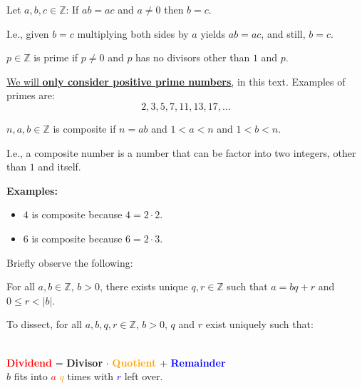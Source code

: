 \begin{Def}

    \label{def:cancellation_law}

    Let $a,b,c\in\mathbb{Z}$: If $ab=ac$ and $a\neq 0$ then $b=c$.

\end{Def}

\noindent
I.e., given $b=c$ multiplying both sides by $a$ yields $ab=ac$, and still, $b=c$.

\newpage

\begin{Def}

    \label{def:prime_numbers}

    $p\in\mathbb{Z}$ is prime if $p\neq 0$ and $p$ has no divisors other than $1$ and $p$.
\end{Def}
\underline{We will \textbf{only consider positive prime numbers},} in this text. Examples of primes are:
$$2,3,5,7,11,13,17,\dots$$

\begin{Def}

    \label{def:composite_numbers}

    $n,a,b\in\mathbb{Z}$ is composite if $n=ab$ and $1<a<n$ and $1<b<n$.
\end{Def}
I.e., a composite number is a number that can be factor into two integers, other than $1$ and itself.

\noindent
\textbf{Examples:}
\begin{itemize}
    \item $4$ is composite because $4=2\cdot2$.
    \item $6$ is composite because $6=2\cdot3$.
\end{itemize}

\noindent
Briefly observe the following:
\begin{theo}

    \label{theo:division_algorithm}

    For all $a,b\in\mathbb{Z}$, $b>0$, there exists unique $q,r\in\mathbb{Z}$ such that $a=bq+r$ and $0\leq r<|b|$.
\end{theo}

\noindent
To dissect, for all $a,b,q,r\in\mathbb{Z}$, $b>0$, $q$ and $r$ exist uniquely such that:

\begin{center}
    \HUGE{\textcolor{red}{$a$}=\textcolor{OliveGreen}{$b$}\textcolor{orange}{$q$}+\textcolor{blue}{$r$}}\\
    \vspace*{.5em}
    \LARGE{\textcolor{red}{\textbf{Dividend}} = \textcolor{OliveGreen}{\textbf{Divisor}} $\cdot$ \textcolor{orange}{\textbf{Quotient}} + \textcolor{blue}{\textbf{Remainder}}}\\
    \Large{\textcolor{OliveGreen}{$b$} fits into \textcolor{red}{$a$} \textcolor{orange}{$q$} times with \textcolor{blue}{$r$} left over.}
\end{center}

